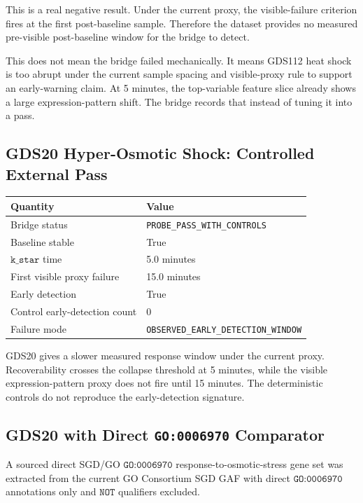 \documentclass[11pt]{article}
\begin{document}
This is a real negative result. Under the current proxy, the visible-failure criterion fires at the first post-baseline sample. Therefore the dataset provides no measured pre-visible post-baseline window for the bridge to detect.

This does not mean the bridge failed mechanically. It means GDS112 heat shock is too abrupt under the current sample spacing and visible-proxy rule to support an early-warning claim. At 5 minutes, the top-variable feature slice already shows a large expression-pattern shift. The bridge records that instead of tuning it into a pass.

\subsection{GDS20 Hyper-Osmotic Shock: Controlled External Pass}

\begin{center}
\begin{tabular}{ll}
\toprule
Quantity & Value \\
\midrule
Bridge status & \texttt{PROBE\_PASS\_WITH\_CONTROLS} \\
Baseline stable & True \\
\(\texttt{k\_star}\) time & 5.0 minutes \\
First visible proxy failure & 15.0 minutes \\
Early detection & True \\
Control early-detection count & 0 \\
Failure mode & \texttt{OBSERVED\_EARLY\_DETECTION\_WINDOW} \\
\bottomrule
\end{tabular}
\end{center}

GDS20 gives a slower measured response window under the current proxy. Recoverability crosses the collapse threshold at 5 minutes, while the visible expression-pattern proxy does not fire until 15 minutes. The deterministic controls do not reproduce the early-detection signature.

\subsection{GDS20 with Direct \texttt{GO:0006970} Comparator}

A sourced direct SGD/GO \(\texttt{GO:0006970}\) response-to-osmotic-stress gene set was extracted from the current GO Consortium SGD GAF with direct \(\texttt{GO:0006970}\) annotations only and \(\texttt{NOT}\) qualifiers excluded.
\end{document}
